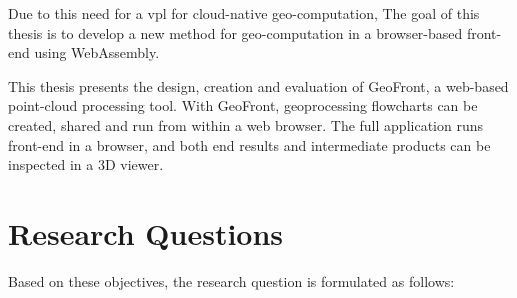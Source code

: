 
Due to this need for a vpl for cloud-native geo-computation, The goal of this thesis is to develop a new method for geo-computation in a browser-based front-end using WebAssembly.

This thesis presents the design, creation and evaluation of GeoFront, a web-based point-cloud processing tool. 
With GeoFront, geoprocessing flowcharts can be created, shared and run from within a web browser.  
The full application runs front-end in a browser, and both end results and intermediate products can be inspected in a 3D viewer.







\newpage
\section{Research Questions}
Based on these objectives, the research question is formulated as follows: 

